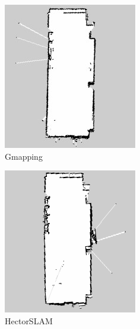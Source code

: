 \begin{figure}[h]
  \begin{center}
  \includegraphics[width=.8\linewidth]{img/slam_33.jpg}
  \caption{Gmapping}
  \label{slam:map:gmapping}
  \end{center}
\end{figure}

\begin{figure}[h]
  \begin{center}
  \includegraphics[width=.8\linewidth]{img/slam_34.png}
  \caption{HectorSLAM}
  \label{slam:map:hectorslam}
  \end{center}
\end{figure}

